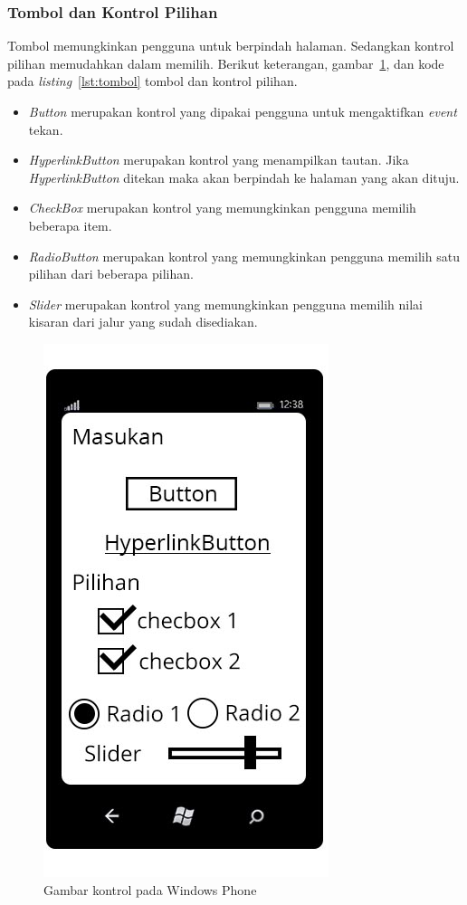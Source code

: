 \subsubsection{Tombol dan Kontrol Pilihan}
\label{subsubsec:Tombol dan Kontrol Pilihan}
\hspace{0.5cm} Tombol memungkinkan pengguna untuk berpindah halaman. Sedangkan kontrol pilihan memudahkan dalam memilih. Berikut keterangan, gambar~\ref{fig:kontrol_tombol}, dan kode pada \textit{listing}~\ref{lst:tombol} tombol dan kontrol pilihan.
 
\begin{itemize}
	\item \textit{Button} merupakan kontrol yang dipakai pengguna untuk mengaktifkan \textit{event} tekan.
	\item \textit{HyperlinkButton} merupakan kontrol yang menampilkan tautan. Jika \textit{HyperlinkButton} ditekan maka akan berpindah ke halaman yang akan dituju.	
	\item \textit{CheckBox} merupakan kontrol yang memungkinkan pengguna memilih beberapa item.
	\item \textit{RadioButton} merupakan kontrol yang memungkinkan pengguna memilih satu pilihan dari beberapa pilihan.
	\item \textit{Slider} merupakan kontrol yang memungkinkan pengguna memilih nilai kisaran dari jalur yang sudah disediakan.
\end{itemize}

\begin{figure}[h]
	\centering
		\includegraphics[scale=0.5]{Gambar/Tombol/tombol_dan_pilihan}
	\caption{Gambar kontrol pada Windows Phone}
	\label{fig:kontrol_tombol}
\end{figure}

